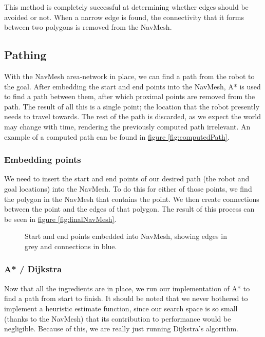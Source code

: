\documentclass[10pt, abstracton, twocolumn]{scrartcl}
\newcommand{\fref}[1]{\hyperref[#1]{figure \vref{#1}}}
\begin{document}
This method is completely successful at determining whether edges should be avoided or not. When a narrow edge is found, the connectivity that it forms between two polygons is removed from the NavMesh.

\subsection{Pathing}
With the NavMesh area-network in place, we can find a path from the robot to the goal. After embedding the start and end points into the NavMesh, A* is used to find a path between them, after which proximal points are removed from the path. The result of all this is a single point; the location that the robot presently needs to travel towards. The rest of the path is discarded, as we expect the world may change with time, rendering the previously computed path irrelevant. An example of a computed path can be found in \fref{fig:computedPath}.

\subsubsection{Embedding points}
We need to insert the start and end points of our desired path (the robot and goal locations) into the NavMesh. To do this for either of those points, we find the polygon in the NavMesh that contains the point. We then create connections between the point and the edges of that polygon. The result of this process can be seen in \fref{fig:finalNavMesh}.

\begin{figure}
        \centering
        
        \caption{\small Start and end points embedded into NavMesh, showing edges in grey and connections in blue.}
        \label{fig:finalNavMesh}
\end{figure}

\subsubsection{A* / Dijkstra}

Now that all the ingredients are in place, we run our implementation of A* to find a path from start to finish. It should be noted that we never bothered to implement a heuristic estimate function, since our search space is so small (thanks to the NavMesh) that its contribution to performance would be negligible. Because of this, we are really just running Dijkstra's algorithm.
\end{document}
